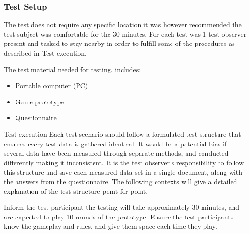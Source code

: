 \subsubsection{Test Setup}
The test does not require any specific location it was however recommended the test subject was comfortable for the 30 minutes. For each test was 1 test observer present and tasked to stay nearby in order to fulfill some of the procedures as described in Test execution.

The test material needed for testing, includes:
\begin{itemize}
\item	Portable computer (PC)
\item	Game prototype
\item	Questionnaire
 \end{itemize}

Test execution
Each test scenario should follow a formulated test structure that ensures every test data is gathered identical. It would be a potential bias if several data have been measured through separate methods, and conducted differently making it inconsistent. It is the test observer's responsibility to follow this structure and save each measured data set in a single document, along with the answers from the questionnaire.
The following contexts will give a detailed explanation of the test structure point for point.

Inform the test participant the testing will take approximately 30 minutes, and are expected to play 10 rounds of the prototype. Ensure the test participants know the gameplay and rules, and give them space each time they play.

